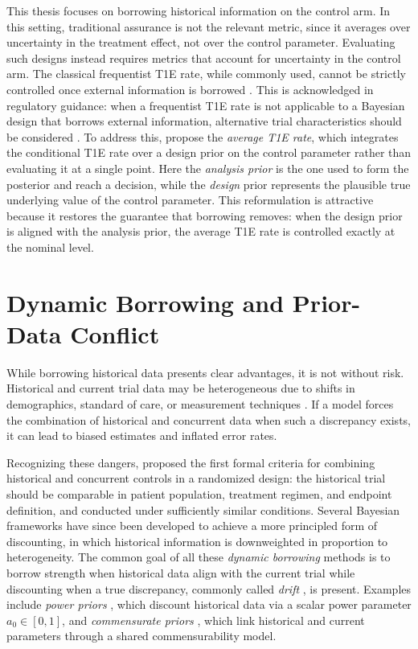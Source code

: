 This thesis focuses on borrowing historical information on the control arm. In this setting, traditional assurance is not the relevant metric, since
it averages over uncertainty in the treatment effect, not over the control parameter. Evaluating such designs instead requires metrics 
that account for uncertainty in the control arm. The classical frequentist T1E rate, while commonly used, cannot be strictly
controlled once external information is borrowed \citep{viele_use_2014, kopp2024simulating}. This is acknowledged in regulatory guidance: when a
frequentist T1E rate is not applicable to a Bayesian design that borrows external information, alternative trial characteristics should be
considered \citep{fda_bayesian_2026}. To address this, \citet{best_beyond_2025}
propose the \textit{average T1E rate}, which integrates the conditional T1E rate over a design prior on the control parameter rather than
 evaluating it at a single point. Here the \textit{analysis prior} is the one used to form the posterior and reach a decision, while
the \textit{design} prior represents the plausible true underlying value of the control parameter. This reformulation is attractive because it restores the
guarantee that borrowing removes: when the design prior is aligned with the analysis prior, the average T1E rate is
controlled exactly at the nominal level.


\section{Dynamic Borrowing and Prior-Data Conflict}
\label{subsec:info-borrowing}

While borrowing historical data presents clear advantages, it is not without risk. Historical and current trial data may be heterogeneous
due to shifts in demographics, standard of care, or measurement techniques \citep{evans_checking_2006}. If a model forces the combination
of historical and concurrent data when such a discrepancy exists, it can lead to biased estimates and inflated error rates.

Recognizing these dangers, \citet{pocock_combination_1976} proposed the first formal criteria for combining historical and concurrent
controls in a randomized design: the historical trial should be comparable in patient population, treatment regimen, and endpoint
definition, and conducted under sufficiently similar conditions. Several Bayesian frameworks have since been developed to achieve a more
principled form of discounting, in which historical information is downweighted in proportion to heterogeneity.  The common goal of all
these \textit{dynamic borrowing} methods is to borrow strength when historical data align with the current trial
while discounting when a true discrepancy, commonly called \textit{drift} \citep{viele_use_2014}, is present. Examples include
\textit{power priors} \citep{ibrahim_power_2000}, which discount historical data via a scalar power parameter $a_0 \in [0,1]$, and \textit{commensurate priors} \citep{hobbs_2011}, which link historical and current parameters through a shared commensurability model.

